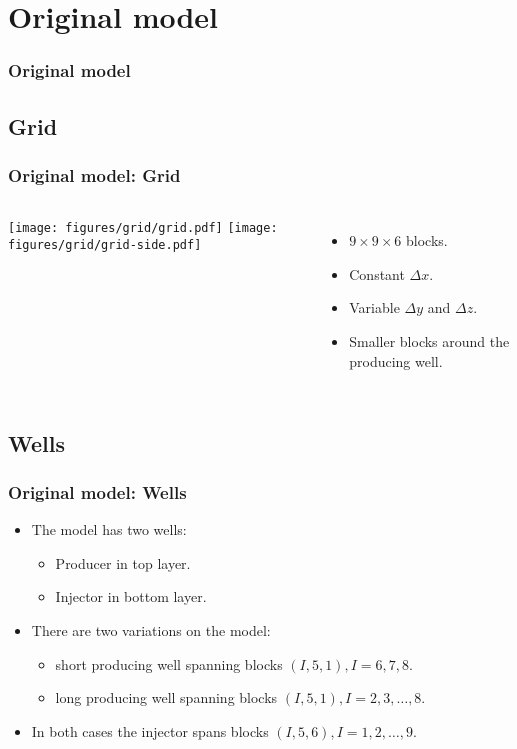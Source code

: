 \section{Original model}
\begin{frame}
    \frametitle{Original model}
\end{frame}

\subsection{Grid}
\begin{frame}
    \frametitle{Original model: Grid}
    \begin{columns}[c]
            \texttt{[image: figures/grid/grid.pdf]}
            \texttt{[image: figures/grid/grid-side.pdf]}
            \begin{itemize}
                \item $9\times 9 \times 6$ blocks.
                \item Constant $\Delta x$.
                \item Variable $\Delta y$ and $\Delta z$. 
                \item Smaller blocks around the producing well.
            \end{itemize}
    \end{columns}
\end{frame}


\subsection{Wells}
\begin{frame}
    \frametitle{Original model: Wells}
    \begin{itemize}
        \item The model has two wells:
            \begin{itemize}
                \item Producer in top layer.
                \item Injector in bottom layer.
            \end{itemize}
        \item There are two variations on the model:
        \begin{itemize}
             \item short producing well spanning blocks $(I,5,1), I=6,7,8$.
             \item long producing well spanning blocks $(I,5,1), I=2,3,\dots,8$.
        \end{itemize}
        \item In both cases the injector spans blocks $(I,5,6),I=1,2,\dots,9$.
    \end{itemize}
\end{frame}
